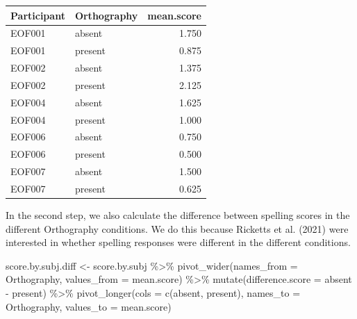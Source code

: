 \documentclass[
  letterpaper,
  DIV=11,
  numbers=noendperiod]{scrreprt}
\newenvironment{Shaded}{\begin{snugshade}}{\end{snugshade}}
\newcommand{\AttributeTok}[1]{\textcolor[rgb]{0.40,0.45,0.13}{#1}}
\newcommand{\FunctionTok}[1]{\textcolor[rgb]{0.28,0.35,0.67}{#1}}
\newcommand{\NormalTok}[1]{\textcolor[rgb]{0.00,0.23,0.31}{#1}}
\newcommand{\OtherTok}[1]{\textcolor[rgb]{0.00,0.23,0.31}{#1}}
\newcommand{\SpecialCharTok}[1]{\textcolor[rgb]{0.37,0.37,0.37}{#1}}
\newcommand{\StringTok}[1]{\textcolor[rgb]{0.13,0.47,0.30}{#1}}
\begin{document}
\begin{table}
\centering
\begin{tabular}{l|l|r}
\hline
Participant & Orthography & mean.score\\
\hline
EOF001 & absent & 1.750\\
\hline
EOF001 & present & 0.875\\
\hline
EOF002 & absent & 1.375\\
\hline
EOF002 & present & 2.125\\
\hline
EOF004 & absent & 1.625\\
\hline
EOF004 & present & 1.000\\
\hline
EOF006 & absent & 0.750\\
\hline
EOF006 & present & 0.500\\
\hline
EOF007 & absent & 1.500\\
\hline
EOF007 & present & 0.625\\
\hline
\end{tabular}
\end{table}

In the second step, we also calculate the difference between spelling
scores in the different Orthography conditions. We do this because
Ricketts et al. (2021) were interested in whether spelling responses
were different in the different conditions.

\begin{Shaded}
\begin{Highlighting}[numbers=left,,]
\NormalTok{score.by.subj.diff }\OtherTok{\textless{}{-}}\NormalTok{ score.by.subj }\SpecialCharTok{\%\textgreater{}\%}
  \FunctionTok{pivot\_wider}\NormalTok{(}\AttributeTok{names\_from =}\NormalTok{ Orthography, }\AttributeTok{values\_from =}\NormalTok{ mean.score) }\SpecialCharTok{\%\textgreater{}\%}
  \FunctionTok{mutate}\NormalTok{(}\AttributeTok{difference.score =}\NormalTok{ absent }\SpecialCharTok{{-}}\NormalTok{ present) }\SpecialCharTok{\%\textgreater{}\%}
  \FunctionTok{pivot\_longer}\NormalTok{(}\AttributeTok{cols =} \FunctionTok{c}\NormalTok{(absent, present), }
               \AttributeTok{names\_to =} \StringTok{\textquotesingle{}Orthography\textquotesingle{}}\NormalTok{,}
               \AttributeTok{values\_to =} \StringTok{\textquotesingle{}mean.score\textquotesingle{}}\NormalTok{) }
\end{Highlighting}
\end{Shaded}
\end{document}
